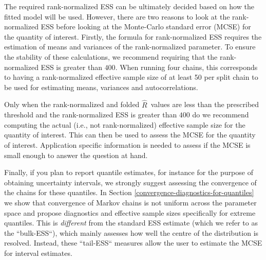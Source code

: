\documentclass[american,]{article}
\newcommand{\Rhat}{$\widehat{R}$}
\theoremstyle{definition}
\begin{document}
The required  rank-normalized ESS can be ultimately decided based on how
 the fitted model will be used. However, there are two reasons to look at
the rank-normalized ESS before looking at the Monte-Carlo standard error (MCSE) 
for the quantity of interest.
 Firstly, the formula for rank-normalized ESS requires the estimation of means
 and variances of the rank-normalized parameter. To ensure the stability of 
 these calculations, we recommend requiring that the rank-normalized ESS is 
 greater than $400$. When running four chains, this corresponds to having
a rank-normalized effective sample size of at least 50 per split chain to be used
for estimating means, variances and autocorrelations. 

Only when the rank-normalized and folded \Rhat\ values are less than the
prescribed threshold and the rank-normalized ESS is greater than $400$ do we recommend
computing the actual (i.e., not rank-normalized) effective sample size for the 
quantity of interest. This can then be used to assess the MCSE for the quantity
of interest. Application specific information is needed to 
assess if the MCSE is small enough to answer the question at hand.

Finally, if you plan to report quantile estimates, for instance for the purpose
of obtaining uncertainty intervals, we 
strongly suggest assessing the convergence of the chains for these quantiles.
In Section \ref{convergence-diagnostics-for-quantiles} we show that
convergence of Markov chains is not uniform across the parameter space
and propose diagnostics and effective sample sizes specifically for extreme 
quantiles. This is \emph{different} from the standard ESS estimate (which 
we refer to as the ``bulk-ESS``), which mainly assesses how well
the centre of the distribution is resolved. Instead, these ``tail-ESS`` 
measures allow the user to estimate the MCSE for interval estimates.
\end{document}
